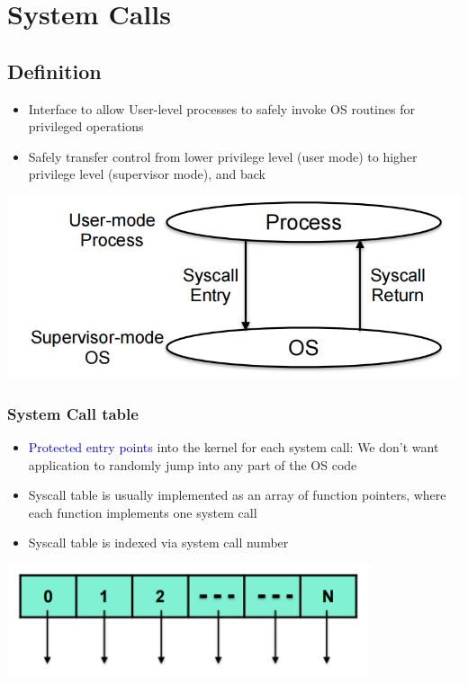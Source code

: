 \documentclass[12pt]{article}
\begin{document}
\section{System Calls}
\subsection{Definition}
\begin{itemize}
    \item Interface to allow User-level processes to safely invoke OS routines for privileged operations
    \item Safely transfer control from lower privilege level (user mode) to higher privilege level (supervisor mode), and back
\end{itemize}
\includegraphics[width=\textwidth]{SystemCalls.png}
\subsubsection{System Call table}
\begin{itemize}
    \item \textcolor{blue}{Protected entry points} into the kernel for each system call: We don’t want application to randomly jump into any part of the OS code
    \item Syscall table is usually implemented as an array of function pointers, where each function implements one system call
    \item Syscall table is indexed via system call number
\end{itemize}
\includegraphics[width=0.8\textwidth]{SystemCallTable.png}
\end{document}

